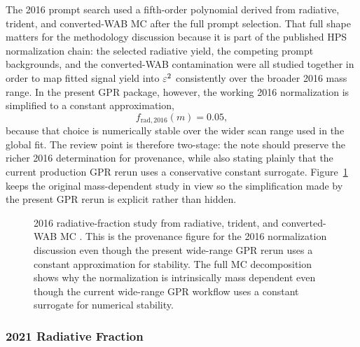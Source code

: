 The 2016 prompt search used a fifth-order polynomial derived from radiative, trident,
and converted-WAB MC after the full prompt selection. That full shape matters for the
methodology discussion because it is part of the published HPS normalization chain:
the selected radiative yield, the competing prompt backgrounds, and the converted-WAB
contamination were all studied together in order to map fitted signal yield into
$\varepsilon^2$ consistently over the broader 2016 mass range. In the present GPR package,
however, the working 2016 normalization is simplified to a constant approximation,
\begin{equation}
f_{\mathrm{rad},2016}(m) = 0.05,
\end{equation}
because that choice is numerically stable over the wider scan range used in the global
fit. The review point is therefore two-stage: the note should preserve the richer 2016
determination for provenance, while also stating plainly that the current production
GPR rerun uses a conservative constant surrogate. Figure~\ref{fig:2016-radfrac} keeps
the original mass-dependent study in view so the simplification made by the present GPR
rerun is explicit rather than hidden.

\begin{figure}[H]
\centering
{}
\caption{2016 radiative-fraction study from radiative, trident, and converted-WAB MC
\cite{HPS2016BumpInternal}. This is the provenance figure for the 2016 normalization
discussion even though the present wide-range GPR rerun uses a constant approximation
for stability. The full MC decomposition shows why the normalization is intrinsically
mass dependent even though the current wide-range GPR workflow uses a constant
surrogate for numerical stability.}
\label{fig:2016-radfrac}
\end{figure}

\subsubsection{2021 Radiative Fraction}

